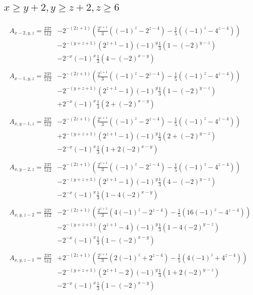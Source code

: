 \subsection*{$x\ge y+2,y\ge z+2,z\ge6$}
\begin{align*}
\begin{split}
A_{x-2,y,z}=\frac{237}{512} &-2^{-(2z+1)}\left(\frac{2^{z+1}}{3}\left((-1)^z-2^{z-4}\right)-\frac{1}{5}\left((-1)^z-4^{z-4}\right)\right)\\
& -2^{-(y+z+1)}\left(2^{z+1}-1\right)(-1)^y\frac{1}{3}\left(1-(-2)^{y-z}\right)\\
& -2^{-x}(-1)^x\frac{1}{3}\left(4-(-2)^{x-y}\right)
\end{split}\\
\begin{split}
A_{x-1,y,z}=\frac{237}{512} &-2^{-(2z+1)}\left(\frac{2^{z+1}}{3}\left((-1)^z-2^{z-4}\right)-\frac{1}{5}\left((-1)^z-4^{z-4}\right)\right)\\
& -2^{-(y+z+1)}\left(2^{z+1}-1\right)(-1)^y\frac{1}{3}\left(1-(-2)^{y-z}\right)\\
& +2^{-x}(-1)^x\frac{1}{3}\left(2+(-2)^{x-y}\right)
\end{split}\\
\begin{split}
A_{x,y-1,z}=\frac{237}{512} &-2^{-(2z+1)}\left(\frac{2^{z+1}}{3}\left((-1)^z-2^{z-4}\right)-\frac{1}{5}\left((-1)^z-4^{z-4}\right)\right)\\
& +2^{-(y+z+1)}\left(2^{z+1}-1\right)(-1)^y\frac{1}{3}\left(2+(-2)^{y-z}\right)\\
& -2^{-x}(-1)^x\frac{1}{3}\left(1+2(-2)^{x-y}\right)
\end{split}\\
\begin{split}
A_{x,y-2,z}=\frac{237}{512} &-2^{-(2z+1)}\left(\frac{2^{z+1}}{3}\left((-1)^z-2^{z-4}\right)-\frac{1}{5}\left((-1)^z-4^{z-4}\right)\right)\\
& -2^{-(y+z+1)}\left(2^{z+1}-1\right)(-1)^y\frac{1}{3}\left(4-(-2)^{y-z}\right)\\
& -2^{-x}(-1)^x\frac{1}{3}\left(1-4(-2)^{x-y}\right)
\end{split}\\
\begin{split}
A_{x,y,z-2}=\frac{237}{512} &-2^{-(2z+1)}\left(\frac{2^{z+1}}{3}\left(4(-1)^z-2^{z-4}\right)-\frac{1}{5}\left(16(-1)^z-4^{z-4}\right)\right)\\
& -2^{-(y+z+1)}\left(2^{z+1}-4\right)(-1)^y\frac{1}{3}\left(1-4(-2)^{y-z}\right)\\
& -2^{-x}(-1)^x\frac{1}{3}\left(1-(-2)^{x-y}\right)
\end{split}\\
\begin{split}
A_{x,y,z-1}=\frac{237}{512} &+2^{-(2z+1)}\left(\frac{2^{z+1}}{3}\left(2(-1)^z+2^{z-4}\right)-\frac{1}{5}\left(4(-1)^z+4^{z-4}\right)\right)\\
& -2^{-(y+z+1)}\left(2^{z+1}-2\right)(-1)^y\frac{1}{3}\left(1+2(-2)^{y-z}\right)\\
& -2^{-x}(-1)^x\frac{1}{3}\left(1-(-2)^{x-y}\right)
\end{split}
\end{align*}

